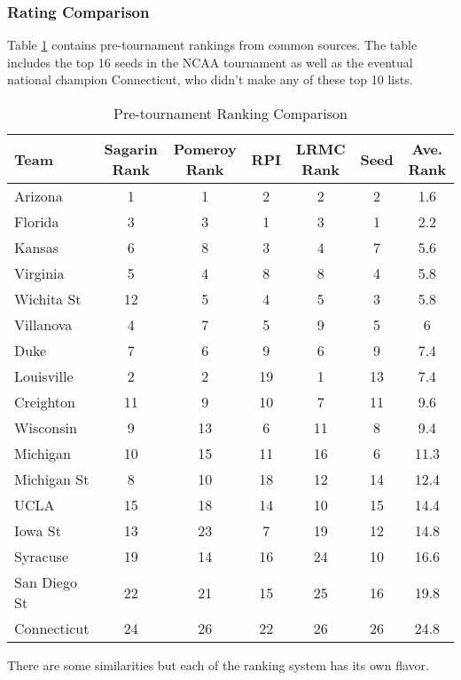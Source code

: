 \subsubsection{Rating Comparison}
Table \ref{tab:ranks} contains pre-tournament rankings from common sources.  The table includes the top 16 seeds in the NCAA tournament as well as the eventual national champion Connecticut, who didn't make any of these top 10 lists.
\begin{table}[h!]
\caption{Pre-tournament Ranking Comparison}
\small
\centering
\begin{tabular}{l|ccccc|c}
  \hline
  \hline
 Team & Sagarin Rank &  Pomeroy Rank & RPI & LRMC Rank & Seed& Ave. Rank  \\ 
  \hline
 Arizona         & 1  &1    & 2     & 2 & 2& 1.6  \\
 Florida          & 3  &3    &1      &3 & 1& 2.2\\
  Kansas         & 6  &8    & 3    & 4& 7 &5.6\\
 Virginia         & 5  &4     &8    &8 & 4 &5.8\\
 Wichita St    & 12 &5      & 4    &5 & 3 &5.8\\
 Villanova      & 4  &7    & 5    & 9 & 5 &6\\
 Duke             & 7  &6     &9     &6 &9&7.4\\
 Louisville      & 2  &2    & 19   & 1 &13 & 7.4\\
  Creighton &  11 &   9 & 10   &7 &11& 9.6\\ 
 Wisconsin  &   9   &13   & 6   &  11 & 8 &9.4\\
 Michigan & 10 & 15& 11& 16& 6 &11.3\\
 Michigan St & 8  &10   & 18 & 12& 14&12.4\\
 UCLA & 15& 18& 14&10 &15 &14.4\\
 Iowa St &13 &23  &7 &19 &12 &14.8 \\
 Syracuse &19 &14  &16 &24 &10 &16.6 \\
 San Diego St&22 &21  &15 &25 &16 &19.8 \\
  \hline
  Connecticut & 24& 26& 22&26& 26&24.8\\
  \hline
   \hline
\end{tabular}
\label{tab:ranks}
\end{table}
There are some similarities but each of the ranking system has its own flavor.